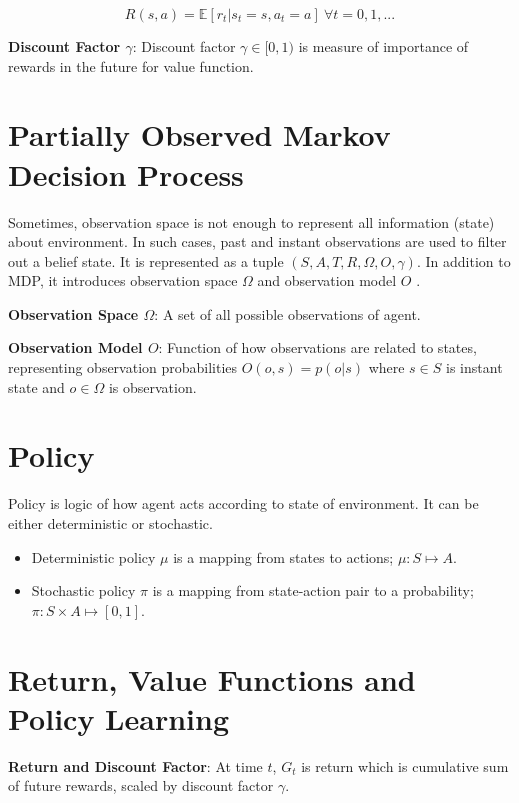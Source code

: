 \begin{equation}
R(s,a) = \mathbb{E}[r_t|s_t=s, a_t=a] \: \forall t = 0,1, ...
\end{equation}

\textbf{Discount Factor $\gamma$}: Discount factor $\gamma \in [0,1)$ is measure of importance of rewards in the future for value function.

\section{Partially Observed Markov Decision Process}
\label{sec:pomdp}
Sometimes, observation space is not enough to represent all information (state) about environment. In such cases, past and instant observations are used to filter out a belief state. It is represented as a tuple $(S,A,T,R,\Omega,O,\gamma)$. In addition to MDP, it introduces observation space $\Omega$ and observation model $O$ \cite{francois-lavet_introduction_2018}.

\textbf{Observation Space $\Omega$}: A set of all possible observations of agent.

\textbf{Observation Model $O$}: Function of how observations are related to states, representing observation probabilities $O(o,s) = p(o|s)$ where $s \in S$ is instant state and $o \in \Omega$ is observation. 

\section{Policy}

Policy is logic of how agent acts according to state of environment. It can be either deterministic or stochastic. 

\begin{itemize}
	\item Deterministic policy $\mu$ is a mapping from states to actions; $\mu \colon S \mapsto A$.
	\item Stochastic policy $\pi$ is a mapping from state-action pair to a probability; $\pi \colon S \times A \mapsto [0,1]$.
\end{itemize}

\section{Return, Value Functions and Policy Learning}

\textbf{Return and Discount Factor}: At time $t$, $G_t$ is return which is cumulative sum of future rewards, scaled by discount factor $\gamma$.

